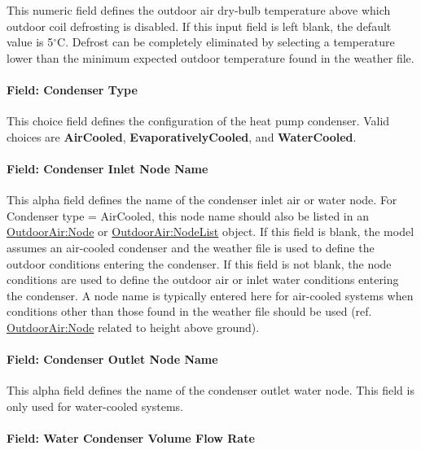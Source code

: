This numeric field defines the outdoor air dry-bulb temperature above which outdoor coil defrosting is disabled. If this input field is left blank, the default value is 5$^\circ$C. Defrost can be completely eliminated by selecting a temperature lower than the minimum expected outdoor temperature found in the weather file.

\paragraph{Field: Condenser Type}\label{field-condenser-type-003}

This choice field defines the configuration of the heat pump condenser. Valid choices are \textbf{AirCooled}, \textbf{EvaporativelyCooled}, and \textbf{WaterCooled}.

\paragraph{Field: Condenser Inlet Node Name}\label{field-condenser-inlet-node-name-000}

This alpha field defines the name of the condenser inlet air or water node. For Condenser type = AirCooled, this node name should also be listed in an \hyperref[outdoorairnode]{OutdoorAir:Node} or \hyperref[outdoorairnodelist]{OutdoorAir:NodeList} object. If this field is blank, the model assumes an air-cooled condenser and the weather file is used to define the outdoor conditions entering the condenser. If this field is not blank, the node conditions are used to define the outdoor air or inlet water conditions entering the condenser. A node name is typically entered here for air-cooled systems when conditions other than those found in the weather file should be used (ref. \hyperref[outdoorairnode]{OutdoorAir:Node} related to height above ground).

\paragraph{Field: Condenser Outlet Node Name}\label{field-condenser-outlet-node-name-000}

This alpha field defines the name of the condenser outlet water node. This field is only used for water-cooled systems.

\paragraph{Field: Water Condenser Volume Flow Rate}\label{field-water-condenser-volume-flow-rate-000}

